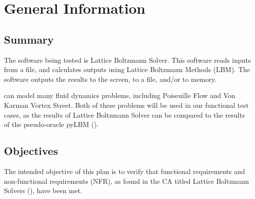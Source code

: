 \documentclass[12pt, titlepage]{article}
\newcommand{\famname}{Lattice Boltzmann Solver}
\begin{document}
\section{General Information} \label{generalinfo}


\subsection{Summary}

The software being tested is \famname. This software reads inputs from a file,
and calculates outputs using Lattice Boltzmann Methods (LBM). The software
outputs the results to the screen, to a file, and/or to memory.

\noindent {\famname} can model many fluid dynamics problems, including
Poiseuille Flow and Von Karman Vortex Street. Both of these problems will be
used in our functional test cases, as the results of {\famname} can be compared
to the results of the pseudo-oracle pyLBM (\citet{pylbmcode}).

\subsection{Objectives} \label{objectives}

The intended objective of this plan is to verify that functional requirements
and non-functional requirements (NFR), as found in the CA titled Lattice
Boltzmann Solvers (\citet{LBM_CA_PM}), have been met. 
\end{document}
